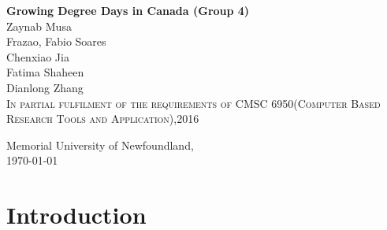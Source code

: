 \documentclass[12pt]{article}
\begin{document}
\begin{titlepage}
	\begin{center}
	
	
	{\Large \bf
Growing Degree Days in Canada (Group 4) \\

\vspace*{0.4in}
}
Zaynab Musa\\ 
Frazao, Fabio Soares\\
Chenxiao Jia\\
Fatima Shaheen\\
Dianlong Zhang\\

\vspace*{0.4in}  
\textsc{\small In partial fulfilment of the requirements of CMSC 6950(Computer Based Research Tools and Application),2016}

\end{center}
\vspace*{5.0in}
\begin{flushleft}
{\textsc Memorial University of Newfoundland,} \\
\today
\end{flushleft}
\end{titlepage}

\newpage
\begin{abstract}
Growing Degree Days (GDDs) are used to estimate the growth and development of plants and insects during the growing season. Heat units expressed in growing degree days(GDDs) are frequently used to describe the timing of biological process

The objective of this paper is to calculate the GDD for selected cities in Canada. We  also provide a visual representation of the accumulated GDD for selected cities in Canada over a given period.A visual examination of the annual cycle of minimum and maximum daily temperatures for canadian cities is explored.


 Finally, we explore how the GDD calculation depends on the base temperature for selected cities in Canada.\\



 Keywords -- {\bf Growing Degree Days(GDDs)}


\end{abstract}
\newpage
\tableofcontents
\listoffigures
\newpage
\section{ \bf Introduction}
\end{document}
